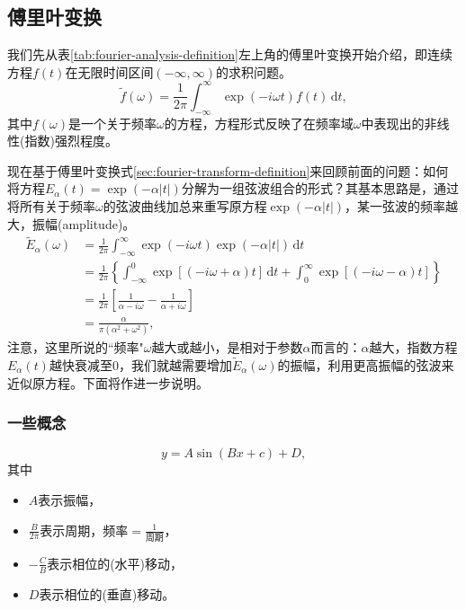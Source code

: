 \subsection{傅里叶变换}
\label{sec:fourier-transform}
我们先从表\ref{tab:fourier-analysis-definition}左上角的傅里叶变换开始介绍，即连续方程$f(t)$在无限时间区间$(-\infty, \infty)$的求积问题。
\begin{equation}
  \label{sec:fourier-transform-definition}
  \tilde{f} \left( \omega \right) =
  \frac{1}{2 \pi} \int_{-\infty}^{\infty}
  \exp \left( - i \omega t \right) f(t) \, \mathrm{d} t,
\end{equation}
其中$f \left( \omega \right)$是一个关于频率$\omega$的方程，方程形式反映了在频率域$\omega$中表现出的非线性(指数)强烈程度。

现在基于傅里叶变换式\eqref{sec:fourier-transform-definition}来回顾前面的问题：如何将方程$E_{\alpha}(t) = \exp \left( - \alpha \left| t \right| \right)$分解为一组弦波组合的形式？其基本思路是，通过将所有关于频率$\omega$的弦波曲线加总来重写原方程$\exp \left( - \alpha \left| t \right| \right)$，某一弦波的频率越大，振幅(amplitude)。
\begin{equation*}
  \begin{split}
    \widetilde{E}_{\alpha} \left( \omega \right)
    & = \frac{1}{2 \pi}
    \int_{-\infty}^{\infty} \exp \left( - i \omega t \right) \exp \left( - \alpha \left| t \right| \right) \, \mathrm{d} t \\
    & = \frac{1}{2 \pi} \left\{
    \int_{-\infty}^{0} \exp \left[ \left( - i \omega + \alpha \right) t \right] \, \mathrm{d} t
    + \int_{0}^{\infty} \exp \left[ \left( - i \omega - \alpha \right) t \right]
    \right\} \\
    & = \frac{1}{2 \pi}
    \left[
    \frac{1}{\alpha - i \omega}
    - \frac{1}{\alpha + i \omega}
    \right] \\
    & = \frac{\alpha}{\pi \left( \alpha^{2} + \omega^{2} \right)},
  \end{split}
\end{equation*}
注意，这里所说的``频率"$\omega$越大或越小，是相对于参数$\alpha$而言的：$\alpha$越大，指数方程$E_{\alpha}(t)$越快衰减至$0$，我们就越需要增加$\widetilde{E}_{\alpha}(\omega)$的振幅，利用更高振幅的弦波来近似原方程。下面将作进一步说明。

\subsubsection{一些概念}
\begin{equation*}
  y = A \sin \left( B x + c \right) + D,
\end{equation*}
其中
\begin{itemize}
  \item $A$表示振幅，
  \item $\frac{B}{2 \pi}$表示周期，$\text{频率} = \frac{1}{\text{周期}}$，
  \item $- \frac{C}{B}$表示相位的(水平)移动，
  \item $D$表示相位的(垂直)移动。
\end{itemize}

